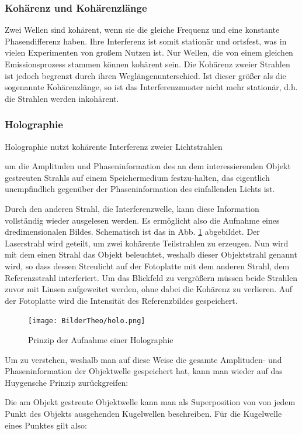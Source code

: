 \subsubsection{Kohärenz und Kohärenzlänge}

Zwei Wellen sind kohärent, wenn sie die gleiche Frequenz und eine konstante Phasendifferenz haben. Ihre Interferenz ist somit stationär und ortsfest, was in vielen Experimenten von großem Nutzen ist. Nur Wellen, die von einem gleichen Emissionsprozess stammen können kohärent sein. Die Kohärenz zweier Strahlen ist jedoch begrenzt durch ihren Weglängenunterschied. Ist dieser größer als die sogenannte Kohärenzlänge, so ist das Interferenzmuster nicht mehr stationär, d.h. die Strahlen werden inkohärent. 


\subsubsection{Holographie}
Holographie nutzt
 kohärente
 Interferenz
 zweier
 Lichtstrahlen

um die Amplituden und Phaseninformation des an dem interessierenden
Objekt gestreuten Strahls auf einem
Speichermedium festzu-halten,
das eigentlich unempfindlich gegenüber
 der Phaseninformation 
des einfallenden Lichts ist.

Durch den anderen Strahl, die Interferenzwelle, kann diese Information vollständig wieder ausgelesen werden. Es ermöglicht also die Aufnahme eines dredimensionalen Bildes. Schematisch ist das in Abb. \ref{theo_holo} abgebildet. Der Laserstrahl wird geteilt, um zwei kohärente Teilstrahlen zu erzeugen. Nun wird mit dem einen Strahl das Objekt beleuchtet, weshalb dieser Objektstrahl genannt wird, so dass dessen Streulicht auf der Fotoplatte mit dem anderen Strahl, dem Referenzstrahl interferiert. Um das Blickfeld zu vergrößern müssen beide Strahlen zuvor mit Linsen aufgeweitet werden, ohne dabei die Kohärenz zu verlieren. Auf der Fotoplatte wird die Intensität des Referenzbildes gespeichert.

\begin{figure}[H]
 \texttt{[image: BilderTheo/holo.png]}
\caption{Prinzip der Aufnahme einer Holographie \cite{staatsex}}
\label{theo_holo}
\end{figure}

Um zu verstehen, weshalb man auf diese Weise die gesamte Amplituden- und Phaseninformation der Objektwelle gespeichert hat, kann man wieder auf das Huygensche Prinzip zurückgreifen:

Die am Objekt gestreute Objektwelle kann man als Superposition von von jedem Punkt des Objekts ausgehenden Kugelwellen beschreiben. Für die Kugelwelle eines Punktes gilt also:

